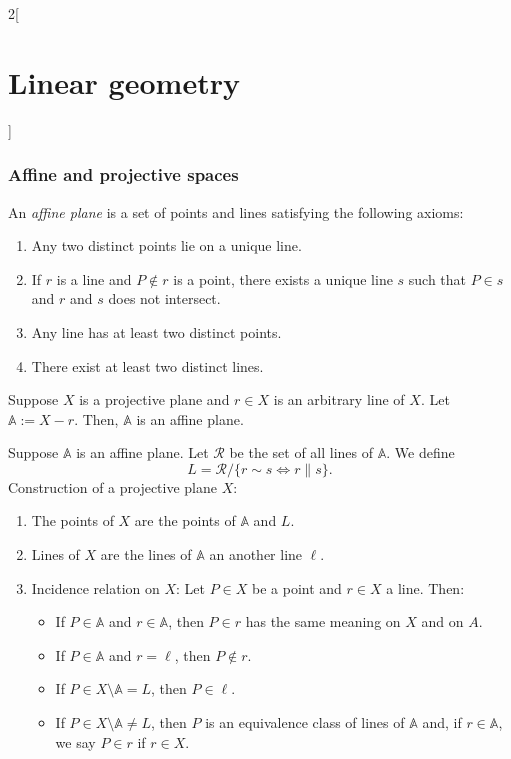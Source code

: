 \documentclass[class=article,10pt,crop=false]{standalone}
\begin{document}
\begin{multicols}{2}[\section{Linear geometry}]
\subsubsection{Affine and projective spaces}
\begin{definition}
An \textit{affine plane} is a set of points and lines satisfying the following axioms:
\begin{enumerate}
    \item Any two distinct points lie on a unique line.
    \item If $r$ is a line and $P\notin r$ is a point, there exists a unique line $s$ such that $P\in s$ and $r$ and $s$ does not intersect.
    \item Any line has at least two distinct points.
    \item There exist at least two distinct lines.
\end{enumerate}
\end{definition}
\begin{prop}
Suppose $X$ is a projective plane and $r\in X$ is an arbitrary line of $X$. Let $\mathbb{A}:=X-r.$ Then, $\mathbb{A}$ is an affine plane.
\end{prop}
\begin{prop}
Suppose $\mathbb{A}$ is an affine plane. Let $\mathcal{R}$ be the set of all lines of $\mathbb{A}$. We define $$L=\mathcal{R}/\{r\sim s\iff r \parallel s\}.$$ Construction of a projective plane $X$:
\begin{enumerate}
    \item The points of $X$ are the points of $\mathbb{A}$ and $L$.
    \item Lines of $X$ are the lines of $\mathbb{A}$ an another line $\ell$.
    \item Incidence relation on $X$: Let $P\in X$ be a point and $r\in X$ a line. Then:
    \begin{itemize}
        \item If $P\in\mathbb{A}$ and $r\in\mathbb{A}$, then $P\in r$ has the same meaning on $X$ and on $A$.
        \item If $P\in\mathbb{A}$ and $r=\ell$, then $P\notin r$.
        \item If $P\in X\setminus\mathbb{A}=L$, then $P\in\ell$.
        \item If $P\in X\setminus\mathbb{A}\ne L$, then $P$ is an equivalence class of lines of $\mathbb{A}$ and, if $r\in\mathbb{A}$, we say $P\in r$ if $r\in X$.
    \end{itemize}
\end{enumerate}
\end{prop}

\end{multicols}
\end{document}
